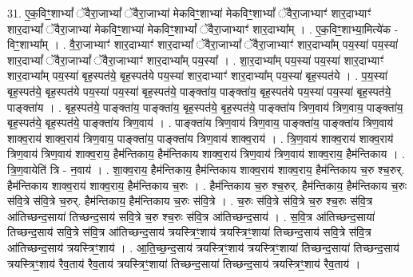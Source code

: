 \documentclass[17pt]{extarticle}
\begin{document}
31. ए॒क॒विꣳ॒॒शाभ्यां᳚ ॅवैरा॒जाभ्यां᳚ ॅवैरा॒जाभ्या॑ मेकविꣳ॒॒शाभ्या॑ मेकविꣳ॒॒शाभ्यां᳚ ॅवैरा॒जाभ्याꣳ॑ शार॒दाभ्याꣳ॑ शार॒दाभ्यां᳚ ॅवैरा॒जाभ्या॑ मेकविꣳ॒॒शाभ्या॑ मेकविꣳ॒॒शाभ्यां᳚ ॅवैरा॒जाभ्याꣳ॑ शार॒दाभ्या᳚म् । . ए॒क॒विꣳ॒॒शाभ्या॒मित्ये॑क - विꣳ॒॒शाभ्या᳚म् । . वै॒रा॒जाभ्याꣳ॑ शार॒दाभ्याꣳ॑ शार॒दाभ्यां᳚ ॅवैरा॒जाभ्यां᳚ ॅवैरा॒जाभ्याꣳ॑ शार॒दाभ्या᳚म् पय॒स्या॑ पय॒स्या॑ शार॒दाभ्यां᳚ ॅवैरा॒जाभ्यां᳚ ॅवैरा॒जाभ्याꣳ॑ शार॒दाभ्या᳚म् पय॒स्या᳚ । . शा॒र॒दाभ्या᳚म् पय॒स्या॑ पय॒स्या॑ शार॒दाभ्याꣳ॑ शार॒दाभ्या᳚म् पय॒स्या॑ बृह॒स्पत॑ये॒ बृह॒स्पत॑ये पय॒स्या॑ शार॒दाभ्याꣳ॑ शार॒दाभ्या᳚म् पय॒स्या॑ बृह॒स्पत॑ये । . प॒य॒स्या॑ बृह॒स्पत॑ये॒ बृह॒स्पत॑ये पय॒स्या॑ पय॒स्या॑ बृह॒स्पत॑ये॒ पाङ्क्ता॑य॒ पाङ्क्ता॑य॒ बृह॒स्पत॑ये पय॒स्या॑ पय॒स्या॑ बृह॒स्पत॑ये॒ पाङ्क्ता॑य । . बृह॒स्पत॑ये॒ पाङ्क्ता॑य॒ पाङ्क्ता॑य॒ बृह॒स्पत॑ये॒ बृह॒स्पत॑ये॒ पाङ्क्ता॑य त्रिण॒वाय॑ त्रिण॒वाय॒ पाङ्क्ता॑य॒ बृह॒स्पत॑ये॒ बृह॒स्पत॑ये॒ पाङ्क्ता॑य त्रिण॒वाय॑ । . पाङ्क्ता॑य त्रिण॒वाय॑ त्रिण॒वाय॒ पाङ्क्ता॑य॒ पाङ्क्ता॑य त्रिण॒वाय॑ शाक्व॒राय॑ शाक्व॒राय॑ त्रिण॒वाय॒ पाङ्क्ता॑य॒ पाङ्क्ता॑य त्रिण॒वाय॑ शाक्व॒राय॑ । . त्रि॒ण॒वाय॑ शाक्व॒राय॑ शाक्व॒राय॑ त्रिण॒वाय॑ त्रिण॒वाय॑ शाक्व॒राय॒ हैम॑न्तिकाय॒ हैम॑न्तिकाय शाक्व॒राय॑ त्रिण॒वाय॑ त्रिण॒वाय॑ शाक्व॒राय॒ हैम॑न्तिकाय । . त्रि॒ण॒वायेति॑ त्रि - न॒वाय॑ । . शा॒क्व॒राय॒ हैम॑न्तिकाय॒ हैम॑न्तिकाय शाक्व॒राय॑ शाक्व॒राय॒ हैम॑न्तिकाय च॒रु श्च॒रुर्. हैम॑न्तिकाय शाक्व॒राय॑ शाक्व॒राय॒ हैम॑न्तिकाय च॒रुः । . हैम॑न्तिकाय च॒रु श्च॒रुर्. हैम॑न्तिकाय॒ हैम॑न्तिकाय च॒रुः स॑वि॒त्रे स॑वि॒त्रे च॒रुर्. हैम॑न्तिकाय॒ हैम॑न्तिकाय च॒रुः स॑वि॒त्रे । . च॒रुः स॑वि॒त्रे स॑वि॒त्रे च॒रु श्च॒रुः स॑वि॒त्र आ॑तिच्छन्द॒साया॑ तिच्छन्द॒साय॑ सवि॒त्रे च॒रु श्च॒रुः स॑वि॒त्र आ॑तिच्छन्द॒साय॑ । . स॒वि॒त्र आ॑तिच्छन्द॒साया॑ तिच्छन्द॒साय॑ सवि॒त्रे स॑वि॒त्र आ॑तिच्छन्द॒साय॑ त्रयस्त्रिꣳ॒॒शाय॑ त्रयस्त्रिꣳ॒॒शाया॑ तिच्छन्द॒साय॑ सवि॒त्रे स॑वि॒त्र आ॑तिच्छन्द॒साय॑ त्रयस्त्रिꣳ॒॒शाय॑ । . आ॒ति॒च्छ॒न्द॒साय॑ त्रयस्त्रिꣳ॒॒शाय॑ त्रयस्त्रिꣳ॒॒शाया॑ तिच्छन्द॒साया॑ तिच्छन्द॒साय॑ त्रयस्त्रिꣳ॒॒शाय॑ रैव॒ताय॑ रैव॒ताय॑ त्रयस्त्रिꣳ॒॒शाया॑ तिच्छन्द॒साया॑ तिच्छन्द॒साय॑ त्रयस्त्रिꣳ॒॒शाय॑ रैव॒ताय॑ । \newline
\end{document}

